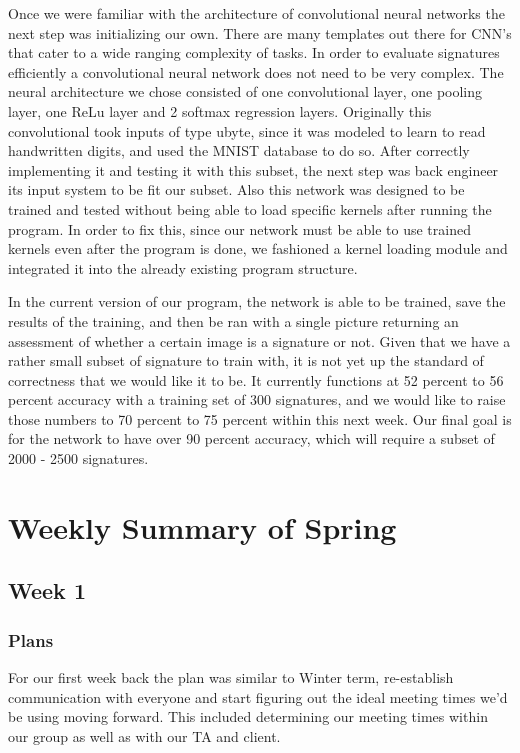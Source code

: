 \documentclass[onecolumn, draftclsnofoot,10pt, compsoc]{IEEEtran}
\begin{document}
Once we were familiar with the architecture of convolutional neural networks the next step was initializing our own. There are many templates out there for CNN’s that cater to a wide ranging complexity of tasks. In order to evaluate signatures efficiently a convolutional neural network does not need to be very complex. The neural architecture we chose consisted of one convolutional layer, one pooling layer, one ReLu layer and 2 softmax regression layers. Originally this convolutional took inputs of type ubyte, since it was modeled to learn to read handwritten digits, and used the MNIST database to do so. After correctly implementing it and testing it with this subset, the next step was back engineer its input system to be fit our subset. Also this network was designed to be trained and tested without being able to load specific kernels after running the program. In order to fix this, since our network must be able to use trained kernels even after the program is done, we fashioned a kernel loading module and integrated it into the already existing program structure. 


In the current version of our program, the network is able to be trained, save the results of the training, and then be ran with a single picture returning an assessment of whether a certain image is a signature or not. Given that we have a rather small subset of signature to train with, it is not yet up the standard of correctness that we would like it to be. It currently functions at 52 percent to 56 percent accuracy with a training set of 300 signatures, and we would like to raise those numbers to 70 percent to 75 percent within this next week. Our final goal is for the network to have over 90 percent accuracy, which will require a subset of 2000 - 2500 signatures. 


\section{Weekly Summary of Spring}
\subsection{Week 1}
\subsubsection{Plans}
For our first week back the plan was similar to Winter term, re-establish communication with everyone and start figuring out the ideal meeting times we'd be using moving forward. This included determining our meeting times within our group as well as with our TA and client.
\end{document}
